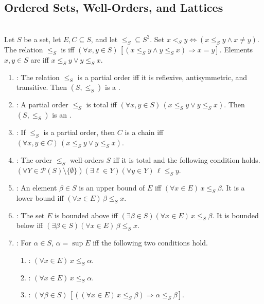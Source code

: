 \subsection{Ordered Sets, Well-Orders, and Lattices}

\begin{definition} \label{def:ordered-set-vocabulary} \\
Let $S$ be a set, let $E,C\subseteq S$, and let $\leq_S\subseteq S^2$. Set $x<_Sy\Longleftrightarrow(x\leq_Sy\land x\neq y)$.\\
The relation $\leq_S$ is  iff $(\forall x,y\in S)\,[(x\leq_Sy\land y\leq_Sx)\Rightarrow x=y]$. Elements $x,y\in S$ are  iff $x\leq_Sy\lor y\leq_Sx$.
\begin{enumerate}[label=(\roman*)]
\setlength{\itemsep}{0pt}
\item {}: The relation $\leq_S$ is a partial order iff it is reflexive, antisymmetric, and transitive. Then $(S,\leq_S)$ is a .
\item {}: A partial order $\leq_S$ is total iff $(\forall x,y\in S)\,(x\leq_Sy\lor y\leq_Sx)$. Then $(S,\leq_S)$ is an .
\item {}: If $\leq_S$ is a partial order, then $C$ is a chain iff $(\forall x,y\in C)\,(x\leq_Sy\lor y\leq_Sx)$.
\item {}: The order $\leq_S$ well-orders $S$ iff it is total and the following condition holds. $(\forall Y\in\mathcal{P}(S)\setminus\{\emptyset\})(\exists \ell\in Y)(\forall y\in Y)\,\ell\leq_Sy$.
\item {}: An element $\beta\in S$ is an upper bound of $E$ iff $(\forall x\in E)\,x\leq_S\beta$. It is a lower bound iff $(\forall x\in E)\,\beta\leq_Sx$.
\item {}: The set $E$ is bounded above iff $(\exists \beta\in S)(\forall x\in E)\,x\leq_S\beta$. It is bounded below iff $(\exists \beta\in S)(\forall x\in E)\,\beta\leq_Sx$.
\item {}: For $\alpha\in S$, $\alpha=\sup E$ iff the following two conditions hold.
\begin{enumerate}[label=\arabic*.]
\setlength{\itemsep}{0pt}
\item {}: $(\forall x\in E)\,x\leq_S\alpha$.
\item {}: $(\forall x\in E)\,x\leq_S\alpha$.
\item {}: $(\forall \beta\in S)\,[((\forall x\in E)\,x\leq_S\beta)\Rightarrow\alpha\leq_S\beta]$.

\end{enumerate}
\end{enumerate}
\end{definition}
